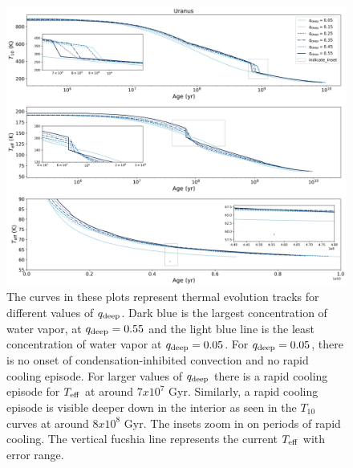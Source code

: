 \documentclass[11pt]{ucscthesisbs}
\begin{document}
{{%
\begin{figure}[ht]
 \centerline{
  \includegraphics[scale=0.45]{figures/u_cooling_curves_nz_4096_more_qdeeps.png}
 }
\caption[Thermal Evolution Curves for Uranus - Water Vapor Concentration Comparisons]
{The curves in these plots represent thermal evolution tracks for different values of $q_{\rm deep}$. Dark blue is the largest concentration of water vapor, at $q_{\rm deep} = 0.55$ and the light blue line is the least concentration of water vapor at $q_{\rm deep} = 0.05$. For $q_{\rm deep} = 0.05$, there is no onset of condensation-inhibited convection and no rapid cooling episode. For larger values of $q_{\rm deep}$ there is a rapid cooling episode for $T_{\rm eff}$ at around $7 x 10^7$ Gyr. Similarly, a rapid cooling episode is visible deeper down in the interior as seen in the $T_{10}$ curves at around $8 x 10^8$ Gyr. The insets zoom in on periods of rapid cooling. The vertical fucshia line represents the current $T_{\rm eff}$ with error range.}
\label{fig:evolve_uranus_qdeeps}
\end{figure}

 

}}
\end{document}
